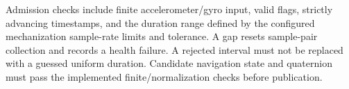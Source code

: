 Admission checks include finite accelerometer/gyro input, valid flags, strictly advancing timestamps, and the duration range defined by the configured mechanization sample-rate limits and tolerance. A gap resets sample-pair collection and records a health failure. A rejected interval must not be replaced with a guessed uniform duration. Candidate navigation state and quaternion must pass the implemented finite/normalization checks before publication.

